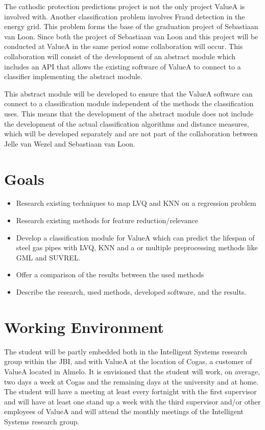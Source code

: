 The cathodic protection predictions project is not the only project ValueA is involved with. Another classification problem involves Fraud detection in the energy grid. This problem forms the base of the graduation project of Sebastiaan van Loon. Since both the project of Sebastiaan van Loon and this project will be conducted at ValueA in the same period some collaboration will occur. This collaboration will consist of the development of an abstract module which includes an API that allows the existing software of ValueA to connect to a classifier implementing the abstract module.

This abstract module will be developed to ensure that the ValueA software can connect to a classification module independent of the methods the classification uses. This means that the development of the abstract module does not include the development of the actual classification algorithms and distance measures, which will be developed separately and are not part of the collaboration between Jelle van Wezel and Sebastiaan van Loon.

\section{Goals}

\begin{itemize}
\item Research existing techniques to map LVQ and KNN on a regression problem
\item Research existing methods for feature reduction/relevance
\item Develop a classification module for ValueA which can predict the lifespan of steel gas pipes with LVQ, KNN and a or multiple preprocessing methods like GML and SUVREL.
\item Offer a comparison of the results between the used methods
\item Describe the research, used methods, developed software, and the results.
\end{itemize}

\section{Working Environment}

The student will be partly embedded both in the Intelligent Systems research group within the JBI, and with ValueA at the location of Cogas, a customer of ValueA located in Almelo. It is envisioned that the student will work, on average, two days a week at Cogas and the remaining days at the university and at home. The student will have a meeting at least every fortnight with the first supervisor and will have at least one stand up a week with the third supervisor and/or other employees of ValueA and will attend the monthly meetings of the Intelligent Systems research group. 


